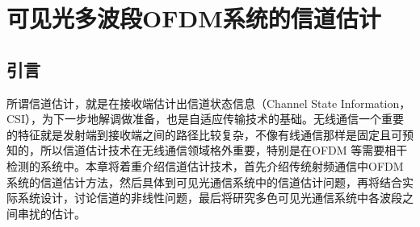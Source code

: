 \chapter{可见光多波段OFDM系统的信道估计}
\section{引言}
所谓信道估计，就是在接收端估计出信道状态信息（Channel State Information，CSI），为下一步地解调做准备，也是自适应传输技术的基础。无线通信一个重要的特征就是发射端到接收端之间的路径比较复杂，不像有线通信那样是固定且可预知的，所以信道估计技术在无线通信领域格外重要，特别是在OFDM 等需要相干检测的系统中。本章将着重介绍信道估计技术，首先介绍传统射频通信中OFDM 系统的信道估计方法，然后具体到可见光通信系统中的信道估计问题，再将结合实际系统设计，讨论信道的非线性问题，最后将研究多色可见光通信系统中各波段之间串扰的估计。
